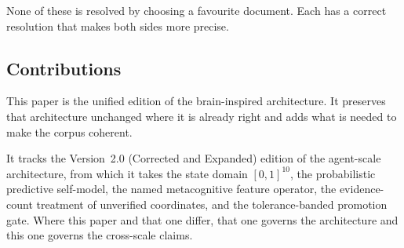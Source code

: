 \documentclass[11pt]{article}
\begin{document}
None of these is resolved by choosing a favourite document. Each has a correct resolution that makes both sides more precise.

\subsection{Contributions}
This paper is the unified edition of the brain-inspired architecture. It preserves that architecture unchanged where it is already right and adds what is needed to make the corpus coherent.

It tracks the Version~2.0 (Corrected and Expanded) edition of the agent-scale architecture, from which it takes the state domain $[0,1]^{10}$, the probabilistic predictive self-model, the named metacognitive feature operator, the evidence-count treatment of unverified coordinates, and the tolerance-banded promotion gate. Where this paper and that one differ, that one governs the architecture and this one governs the cross-scale claims.
\end{document}
